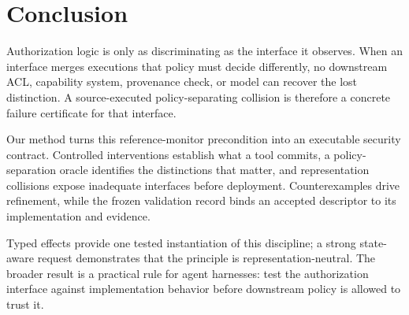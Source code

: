 \section{Conclusion}

Authorization logic is only as discriminating as the interface it observes.
When an interface merges executions that policy must decide differently, no
downstream ACL, capability system, provenance check, or model can recover the
lost distinction. A source-executed policy-separating collision is therefore a
concrete failure certificate for that interface.

Our method turns this reference-monitor precondition into an executable
security contract. Controlled interventions establish what a tool commits, a
policy-separation oracle identifies the distinctions that matter, and
representation collisions expose inadequate interfaces before deployment.
Counterexamples drive refinement, while the frozen validation record binds an
accepted descriptor to its implementation and evidence.

Typed effects provide one tested instantiation of this discipline; a strong
state-aware request demonstrates that the principle is representation-neutral.
The broader result is a practical rule for agent harnesses: test the
authorization interface against implementation behavior before downstream
policy is allowed to trust it.
\label{technical-body-end}
